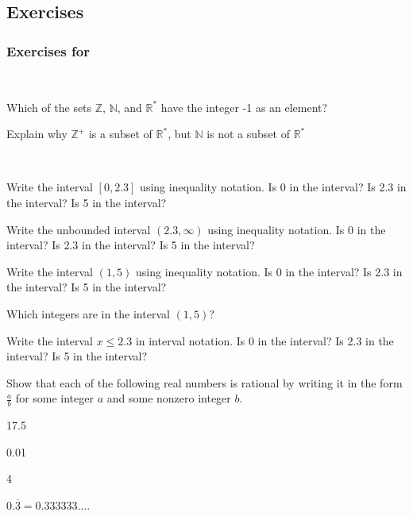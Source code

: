 
\subsection{Exercises}


\subsubsection*{Exercises for  \subinfsetsnumbers}

\begin{exer}[\exerP] %
\label{exer_subsets_inf_sets_numbers}
~
    \begin{exerpart}
        \item Which of the sets $\mathbb{Z}$, $\mathbb{N}$, and $\mathbb{R}^*$ have the integer -1 as an element?    
        \item Explain why $\mathbb{Z}^+$ is a subset of $\mathbb{R}^*$, but $\mathbb{N}$ is not a subset of $\mathbb{R}^*$
    \end{exerpart}
\end{exer}

\begin{exer}[\exerP] %
\label{exer_intervals}
~
    \begin{exerpart}
        \item Write the interval $[0,2.3]$ using inequality notation.  Is 0 in the interval?  Is 2.3 in the interval? Is 5 in the interval?
        \item Write the unbounded interval $(2.3,\infty)$ using inequality notation.  Is 0 in the interval? Is 2.3 in the interval? Is 5 in the interval?
        \item Write the interval $(1,5)$ using inequality notation.  Is 0 in the interval?  Is 2.3 in the interval? Is 5 in the interval?
        \item Which integers are in the interval $(1,5)$?
        \item Write the interval $x \le 2.3$ in interval notation.  Is 0 in the interval?  Is 2.3 in the interval? Is 5 in the interval?
    \end{exerpart}
\end{exer}

\begin{exer}[\exerU] %
\label{exer_show_rational}   
    Show that each of the following real numbers is rational by writing it in the form $\frac{a}{b}$ for some integer $a$ and some nonzero integer $b$.
        \begin{exerpart}
            \item 17.5
            \item 0.01
            \item 4
            \item $0.\overline{3}=0.333333\ldots$.          
        \end{exerpart}
\end{exer}

